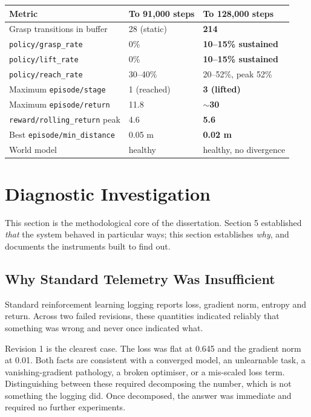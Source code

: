 \documentclass[12pt,a4paper,oneside]{report}
\begin{document}
\begin{longtable}[]{@{}lll@{}}
\toprule\noalign{}
Metric & To 91,000 steps & To 128,000 steps \\
\midrule\noalign{}
\endhead
\bottomrule\noalign{}
\endlastfoot
Grasp transitions in buffer & 28 (static) & \textbf{214} \\
\texttt{policy/grasp\_rate} & 0\% & \textbf{10--15\% sustained} \\
\texttt{policy/lift\_rate} & 0\% & \textbf{10--15\% sustained} \\
\texttt{policy/reach\_rate} & 30--40\% & 20--52\%, peak 52\% \\
Maximum \texttt{episode/stage} & 1 (reached) & \textbf{3 (lifted)} \\
Maximum \texttt{episode/return} & 11.8 & \textbf{$\sim$30} \\
\texttt{reward/rolling\_return} peak & 4.6 & \textbf{5.6} \\
Best \texttt{episode/min\_distance} & 0.05 m & \textbf{0.02 m} \\
World model & healthy & healthy, no divergence \\
\end{longtable}

\newpage

\hypertarget{diagnostic-investigation}{%
\chapter{Diagnostic Investigation}\label{diagnostic-investigation}}

This section is the methodological core of the dissertation. Section 5
established \emph{that} the system behaved in particular ways; this section
establishes \emph{why}, and documents the instruments built to find out.

\hypertarget{why-standard-telemetry-was-insufficient}{%
\section{Why Standard Telemetry Was Insufficient}\label{why-standard-telemetry-was-insufficient}}

Standard reinforcement learning logging reports loss, gradient norm, entropy and
return. Across two failed revisions, these quantities indicated reliably that
something was wrong and never once indicated what.

Revision 1 is the clearest case. The loss was flat at 0.645 and the gradient norm
at 0.01. Both facts are consistent with a converged model, an unlearnable task,
a vanishing-gradient pathology, a broken optimiser, or a mis-scaled loss term.
Distinguishing between these required decomposing the number, which is not
something the logging did. Once decomposed, the answer was immediate and
required no further experiments.
\end{document}
